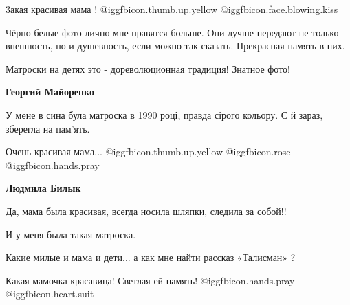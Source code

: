  
 
 
 
 

3акая красивая мама ! @igg{fbicon.thumb.up.yellow}  @igg{fbicon.face.blowing.kiss} 


Чёрно-белые фото лично мне нравятся больше. Они лучше передают не только
внешность, но и душевность, если можно так сказать. Прекрасная память в них.

Матроски на детях это - дореволюционная традиция! Знатное фото!

\textbf{Георгий Майоренко} 

У мене в сина була матроска в 1990 році, правда сірого кольору. Є й зараз,
зберегла на пам'ять.


Очень красивая мама...  @igg{fbicon.thumb.up.yellow}  @igg{fbicon.rose}
@igg{fbicon.hands.pray} 

\textbf{Людмила Билык} 

Да, мама была красивая, всегда носила шляпки, следила за собой!!

И у меня была такая матроска.

Какие милые и мама и дети... а как мне найти рассказ «Талисман» ?

Какая мамочка красавица! Светлая ей память! @igg{fbicon.hands.pray} @igg{fbicon.heart.suit}
